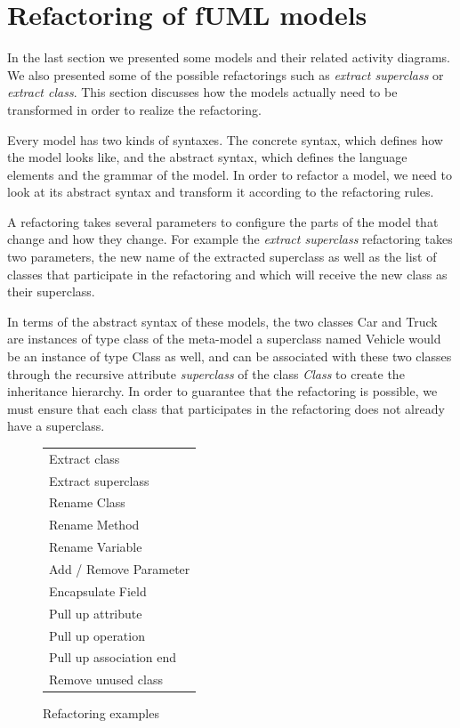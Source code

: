 \documentclass{llncs}
\begin{document}
\section{Refactoring of fUML models}
\label{sec:fuml-refactoring}

In the last section we presented some models and their related activity diagrams. We also presented some of the possible refactorings such as \textit{extract superclass} or \textit{extract class}. This section discusses how the models actually need to be transformed in order to realize the refactoring.

Every model has two kinds of syntaxes. The concrete syntax, which defines how the model looks like, and the abstract
syntax, which defines the language elements and the grammar of the model. In order to refactor a model, we need to look at
its abstract syntax and transform it according to the refactoring rules.

A refactoring takes several parameters to configure the parts of the model that change and how they change. For example
the \textit{extract superclass} refactoring takes two parameters, the new name of the extracted superclass as well as
the list of classes that participate in the refactoring and which will receive the new class as their superclass.

In terms of the abstract syntax of these models, the two classes Car and Truck are instances of type class of the meta-model a superclass named Vehicle would be an instance of type Class as well, and can be associated with these two classes through the recursive attribute \textit{superclass} of the class \textit{Class} to create the inheritance hierarchy. In order to guarantee that the refactoring is possible, we must ensure that each class that participates in the 
refactoring does not already have a superclass.

\begin{figure}[h!t]
 \centering
 \begin{tabular}[]{l}
  \hline
  Extract class\\
  Extract superclass\\
  Rename Class\\
  Rename Method\\
  Rename Variable\\
  Add / Remove Parameter\\
  Encapsulate Field\\
  Pull up attribute\\
  Pull up operation\\
  Pull up association end\\
  Remove unused class\\
  \hline
 \end{tabular}
 \caption{Refactoring examples}
 \label{fig:refactoringlist}
\end{figure}
\end{document}
